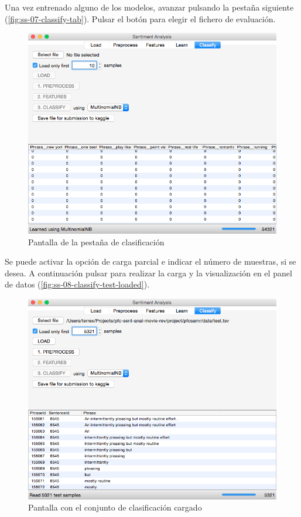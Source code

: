 Una vez entrenado alguno de los modelos, avanzar pulsando la pestaña siguiente (\autoref{fig:ss-07-classify-tab}). Pulsar el botón  para elegir el fichero  de evaluación.

\begin{figure}[H]
\centering
\includegraphics[width=14cm]{ss-07-classify-tab}
\caption{Pantalla de la pestaña de clasificación}
\label{fig:ss-07-classify-tab}
\end{figure}

\newpage
Se puede activar la opción de carga parcial e indicar el número de muestras, si se desea. A continuación pulsar  para realizar la carga y la visualización en el panel de datos (\autoref{fig:ss-08-classify-test-loaded}).

\begin{figure}[H]
\centering
\includegraphics[width=14cm]{ss-08-classify-test-loaded}
\caption{Pantalla con el conjunto de clasificación cargado}
\label{fig:ss-08-classify-test-loaded}
\end{figure}

